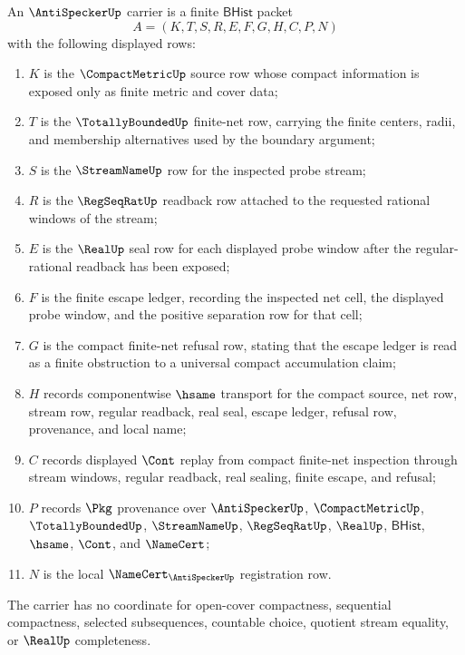 \begin{definition}
\label{def:anti-specker-carrier}
An $\AntiSpeckerUp$ carrier is a finite $\mathsf{BHist}$ packet
$$
A=(K,T,S,R,E,F,G,H,C,P,N)
$$
with the following displayed rows:
\begin{enumerate}
\item $K$ is the $\CompactMetricUp$ source row whose compact information is exposed only as finite metric and cover data;
\item $T$ is the $\TotallyBoundedUp$ finite-net row, carrying the finite centers, radii, and membership alternatives used by the boundary argument;
\item $S$ is the $\StreamNameUp$ row for the inspected probe stream;
\item $R$ is the $\RegSeqRatUp$ readback row attached to the requested rational windows of the stream;
\item $E$ is the $\RealUp$ seal row for each displayed probe window after the regular-rational readback has been exposed;
\item $F$ is the finite escape ledger, recording the inspected net cell, the displayed probe window, and the positive separation row for that cell;
\item $G$ is the compact finite-net refusal row, stating that the escape ledger is read as a finite obstruction to a universal compact accumulation claim;
\item $H$ records componentwise $\hsame$ transport for the compact source, net row, stream row, regular readback, real seal, escape ledger, refusal row, provenance, and local name;
\item $C$ records displayed $\Cont$ replay from compact finite-net inspection through stream windows, regular readback, real sealing, finite escape, and refusal;
\item $P$ records $\Pkg$ provenance over $\AntiSpeckerUp$, $\CompactMetricUp$, $\TotallyBoundedUp$, $\StreamNameUp$, $\RegSeqRatUp$, $\RealUp$, $\mathsf{BHist}$, $\hsame$, $\Cont$, and $\NameCert$;
\item $N$ is the local $\NameCert_{\AntiSpeckerUp}$ registration row.
\end{enumerate}
The carrier has no coordinate for open-cover compactness, sequential compactness, selected subsequences, countable choice, quotient stream equality, or $\RealUp$ completeness.
\end{definition}


